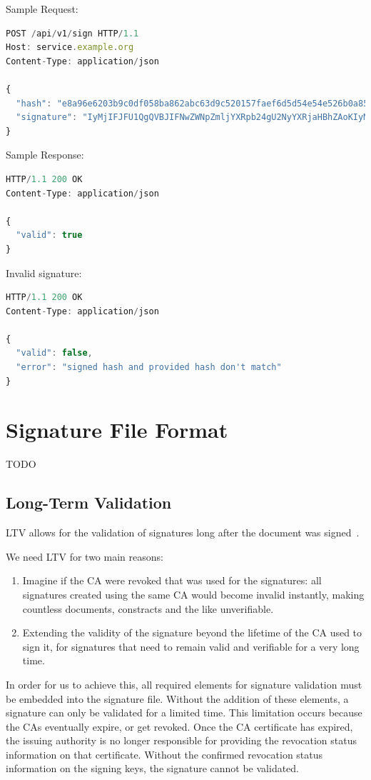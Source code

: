 Sample Request:
\begin{lstlisting}[caption={sign request}, captionpos=b, language=JavaScript, label={lst:verifyrequest}]
POST /api/v1/sign HTTP/1.1
Host: service.example.org
Content-Type: application/json

{
  "hash": "e8a96e6203b9c0df058ba862abc63d9c520157faef6d5d54e54e526b0a85b2be",
  "signature": "IyMjIFJFU1QgQVBJIFNwZWNpZmljYXRpb24gU2NyYXRjaHBhZAoKIyMjIyBQcmUtQXV0aCBlbmRw...b2ludCAKIyMjIyMgRW5kcG9pbnQKYGBgUE9TVCAvYXBpL3YxL3NpZ25gYGAK"
}
\end{lstlisting}

Sample Response:

\begin{lstlisting}[caption={sign response}, captionpos=b, language=JavaScript, label={lst:verifyresponse}]
HTTP/1.1 200 OK
Content-Type: application/json

{
  "valid": true
}
\end{lstlisting}

Invalid signature:

\begin{lstlisting}[caption={sign response}, captionpos=b, language=JavaScript, label={lst:verifyresponsefailed}]
HTTP/1.1 200 OK
Content-Type: application/json

{
  "valid": false,
  "error": "signed hash and provided hash don't match"
}
\end{lstlisting}

\section{Signature File Format}
TODO
\subsection{Long-Term Validation}
\gls{LTV} allows for the validation of signatures long after the document was signed~\cite{etsipades}.

We need \gls{LTV} for two main reasons:
\begin{enumerate}
    \item Imagine if the \gls{CA} were revoked that was used for the signatures: all signatures created using the same \gls{CA} would become invalid instantly, making countless documents, constracts and the like unverifiable.
    \item Extending the validity of the signature beyond the lifetime of the \gls{CA} used to sign it, for signatures that need to remain valid and verifiable for a very long time.
\end{enumerate}
In order for us to achieve this, all required elements for signature validation must be embedded into the signature file.
Without the addition of these elements, a signature can only be validated for a limited time.
This limitation occurs because the \gls{CA}s eventually expire, or get revoked.
Once the \gls{CA} certificate has expired, the issuing authority is no longer responsible for providing the revocation status information on that certificate.
Without the confirmed revocation status information on the signing keys, the signature cannot be validated.

